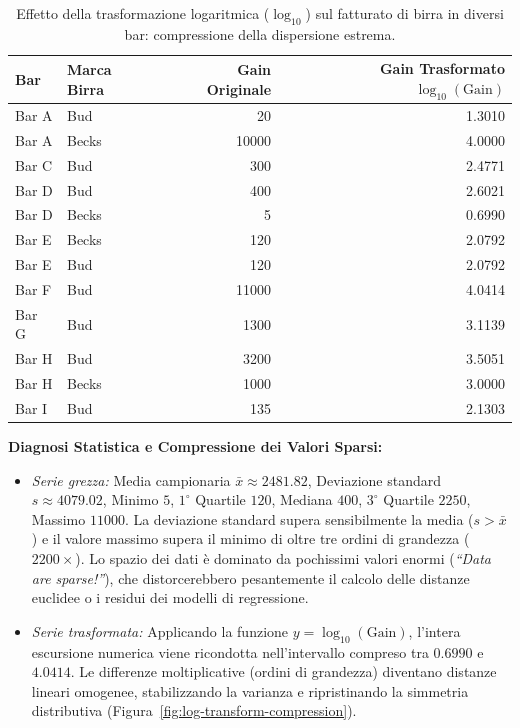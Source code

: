 \begin{itemize}
\begin{example}
    \begin{table}[H]
    \centering
    \small
    \begin{tabular}{llrr}
    \toprule
    \textbf{Bar} & \textbf{Marca Birra} & \textbf{Gain Originale} & \textbf{Gain Trasformato } $\log_{10}(\text{Gain})$ \\
    \midrule
    Bar A & Bud   & 20    & 1.3010 \\
    Bar A & Becks & 10000 & 4.0000 \\
    Bar C & Bud   & 300   & 2.4771 \\
    Bar D & Bud   & 400   & 2.6021 \\
    Bar D & Becks & 5     & 0.6990 \\
    Bar E & Becks & 120   & 2.0792 \\
    Bar E & Bud   & 120   & 2.0792 \\
    Bar F & Bud   & 11000 & 4.0414 \\
    Bar G & Bud   & 1300  & 3.1139 \\
    Bar H & Bud   & 3200  & 3.5051 \\
    Bar H & Becks & 1000  & 3.0000 \\
    Bar I & Bud   & 135   & 2.1303 \\
    \bottomrule
    \end{tabular}
    \caption{Effetto della trasformazione logaritmica ($\log_{10}$) sul fatturato di birra in diversi bar: compressione della dispersione estrema.}
    \label{tab:bar-beer-gain}
    \end{table}

    \textbf{Diagnosi Statistica e Compressione dei Valori Sparsi:}
    \begin{itemize}
        \item \textit{Serie grezza:} Media campionaria $\bar{x} \approx 2481.82$, Deviazione standard $s \approx 4079.02$, Minimo $5$, $1^\circ$ Quartile $120$, Mediana $400$, $3^\circ$ Quartile $2250$, Massimo $11000$. La deviazione standard supera sensibilmente la media ($s > \bar{x}$) e il valore massimo supera il minimo di oltre tre ordini di grandezza ($2200 \times$). Lo spazio dei dati è dominato da pochissimi valori enormi (\textit{``Data are sparse!''}), che distorcerebbero pesantemente il calcolo delle distanze euclidee o i residui dei modelli di regressione.
        \item \textit{Serie trasformata:} Applicando la funzione $y = \log_{10}(\text{Gain})$, l'intera escursione numerica viene ricondotta nell'intervallo compreso tra $0.6990$ e $4.0414$. Le differenze moltiplicative (ordini di grandezza) diventano distanze lineari omogenee, stabilizzando la varianza e ripristinando la simmetria distributiva (Figura~\ref{fig:log-transform-compression}).
    \end{itemize}
    \end{example}


\end{itemize}
